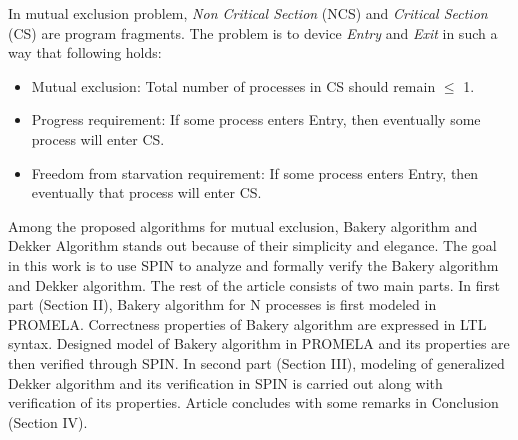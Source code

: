 \documentclass[conference]{IEEEtran}
\begin{document}
In mutual exclusion problem, \textit{Non Critical Section} (NCS) and \textit{Critical Section} (CS) are program fragments. 
The problem is to device \textit{Entry} and \textit{Exit} in such a way that following holds: 
\begin{itemize}
 \item Mutual exclusion: Total number of processes in CS should remain $\leq$ 1.
 \item Progress requirement: If some process enters Entry, then eventually some process will enter CS. 
 \item Freedom from starvation requirement: If some process enters Entry, then eventually that process will enter CS. 
\end{itemize}

Among the proposed algorithms for mutual exclusion, Bakery algorithm \cite{13} and Dekker Algorithm \cite{9} stands out because of their simplicity
and elegance. 
The goal in this work is to use SPIN to analyze and formally verify the Bakery algorithm and Dekker algorithm. The rest of the article 
consists of two main parts. In first part (Section II), Bakery algorithm for N processes is first modeled in PROMELA. Correctness properties of 
Bakery algorithm are expressed in LTL syntax. Designed model of Bakery algorithm in PROMELA and its properties are then verified through SPIN.
In second part (Section III), modeling of generalized Dekker algorithm and its verification in SPIN is carried out along with verification of 
its properties. Article concludes with some remarks in Conclusion (Section IV).
\end{document}
